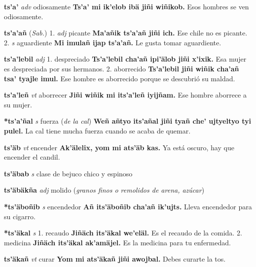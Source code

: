 \documentclass[10pt]{scrbook}
\newcommand{\entry}[1]{\textbf{#1}}
\newcommand{\onedefinition}[1]{#1.}
\newcommand{\partofspeech}[1]{\textit{#1}}
\newcommand{\spanishtranslation}[1]{#1}
\newcommand{\clarification}[1]{(\textit{#1})}
\newcommand{\cholexample}[1]{\textbf{#1}}
\newcommand{\exampletranslation}[1]{#1}
\newcommand{\relevantdialect}[1]{(\textit{#1})}
\begin{document}
\begin{multicols}{2}
\entry{ts'a'}
\partofspeech{adv}
\spanishtranslation{odiosamente}
\cholexample{Ts'a' mi ik'elob ibä jiñi wiñikob.}
\exampletranslation{Esos hombres se ven odiosamente.}

\entry{ts'a'añ}
\relevantdialect{Sab.}
\onedefinition{1}
\partofspeech{adj}
\spanishtranslation{picante}
\cholexample{Ma'añik ts'a'añ jiñi ich.}
\exampletranslation{Ese chile no es picante.}
\onedefinition{2}
\partofspeech{s}
\spanishtranslation{aguardiente}
\cholexample{Mi imulañ ijap ts'a'añ.}
\exampletranslation{Le gusta tomar aguardiente.}

\entry{ts'a'lebil}
\partofspeech{adj}
\onedefinition{1}
\spanishtranslation{despreciado}
\cholexample{Ts'a'lebil cha'añ ipi'älob jiñi x'ixik.}
\exampletranslation{Esa mujer es despreciada por sus hermanos.}
\onedefinition{2}
\spanishtranslation{aborrecido}
\cholexample{Ts'a'lebil jiñi wiñik cha'añ tsa' tyajle imul.}
\exampletranslation{Ese hombre es aborrecido porque se descubrió su maldad.}

\entry{ts'a'leñ}
\partofspeech{vt}
\spanishtranslation{aborrecer}
\cholexample{Jiñi wiñik mi its'a'leñ iyijñam.}
\exampletranslation{Ese hombre aborrece a su mujer.}

\entry{*ts'a'ñal}
\partofspeech{s}
\spanishtranslation{fuerza}
\clarification{de la cal}
\cholexample{Weñ añtyo its'añal jiñi tyañ che' ujtyeltyo tyi pulel.}
\exampletranslation{La cal tiene mucha fuerza cuando se acaba de quemar.}

\entry{ts'äb}
\partofspeech{vt}
\spanishtranslation{encender}
\cholexample{Ak'älelix, yom mi ats'äb kas.}
\exampletranslation{Ya está oscuro, hay que encender el candil.}

\entry{ts'äbab}
\partofspeech{s}
\spanishtranslation{clase de bejuco chico y espinoso}

\entry{ts'äbäkña}
\partofspeech{adj}
\spanishtranslation{molido}
\clarification{granos finos o remolidos de arena, azúcar}

\entry{*ts'äboñib}
\partofspeech{s}
\spanishtranslation{encendedor}
\cholexample{Añ its'äboñib cha'añ ik'ujts.}
\exampletranslation{Lleva encendedor para su cigarro.}

\entry{*ts'äkal}
\partofspeech{s}
\onedefinition{1}
\spanishtranslation{recaudo}
\cholexample{Jiñäch its'äkal we'eläl.}
\exampletranslation{Es el recaudo de la comida.}
\onedefinition{2}
\spanishtranslation{medicina}
\cholexample{Jiñäch its'äkal ak'amäjel.}
\exampletranslation{Es la medicina para tu enfermedad.}

\entry{ts'äkañ}
\partofspeech{vt}
\spanishtranslation{curar}
\cholexample{Yom mi ats'äkañ jiñi awojbal.}
\exampletranslation{Debes curarte la tos.}


\end{multicols}
\end{document}
